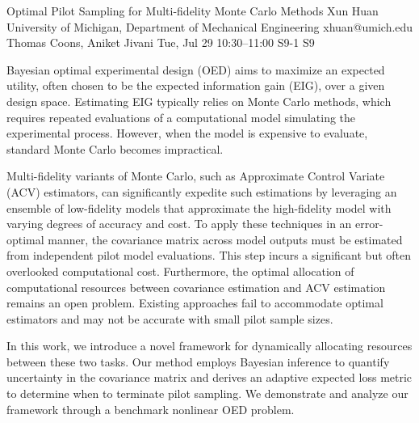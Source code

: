 \begin{talk}
  {Optimal Pilot Sampling for Multi-fidelity Monte Carlo Methods}%
  {Xun Huan}%
  {University of Michigan, Department of Mechanical Engineering}%
  {xhuan@umich.edu}%
  {Thomas Coons, Aniket Jivani}%
  {}%
  {Tue, Jul 29 10:30–11:00}%
  {S9-1}%
  {S9}%
  
				

Bayesian optimal experimental design (OED) aims to maximize an expected utility, often chosen to be the expected information gain (EIG), over a given design space. Estimating EIG typically relies on Monte Carlo methods, which requires repeated evaluations of a computational model simulating the experimental process. 
However, when the model is expensive to evaluate, standard Monte Carlo becomes impractical.

Multi-fidelity variants of Monte Carlo, such as Approximate Control Variate (ACV) estimators, can significantly expedite such estimations by leveraging an ensemble of low-fidelity models that approximate the high-fidelity model with varying degrees of accuracy and cost. 
To apply these techniques in an error-optimal manner, the covariance matrix across model outputs must be estimated from independent pilot model evaluations. This step incurs a significant but often overlooked computational cost. 
Furthermore, the optimal allocation of computational resources between 
covariance estimation and 
ACV estimation remains an open problem.  Existing approaches fail to accommodate optimal estimators and may not be accurate with small pilot sample sizes.

In this work, we introduce a novel framework for dynamically allocating resources between these two tasks.
Our method employs Bayesian inference
to quantify uncertainty in the covariance matrix and derives an adaptive expected loss metric
to determine when to terminate pilot sampling. 
We demonstrate and analyze our framework through a benchmark nonlinear OED problem. 


\end{talk}
